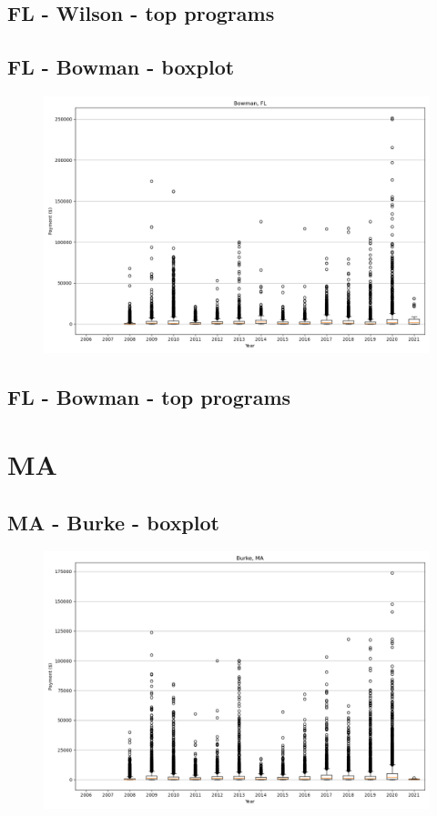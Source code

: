 \subsection*{FL - Wilson - top programs}

\newpage
\subsection*{FL - Bowman - boxplot}
\begin{figure}[h]
\centering
\includegraphics[width=7in]{../output/boxplots/counties/Bowman-FL_boxplot.png}
\end{figure}


\subsection*{FL - Bowman - top programs}

\newpage
\section*{MA}
\subsection*{MA - Burke - boxplot}
\begin{figure}[h]
\centering
\includegraphics[width=7in]{../output/boxplots/counties/Burke-MA_boxplot.png}
\end{figure}


